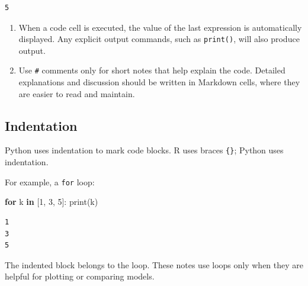 \documentclass[
  letterpaper,
  DIV=11,
  numbers=noendperiod]{scrreprt}
\newenvironment{Shaded}{\begin{snugshade}}{\end{snugshade}}
\newcommand{\BuiltInTok}[1]{\textcolor[rgb]{0.00,0.23,0.31}{#1}}
\newcommand{\ControlFlowTok}[1]{\textcolor[rgb]{0.00,0.23,0.31}{\textbf{#1}}}
\newcommand{\DecValTok}[1]{\textcolor[rgb]{0.68,0.00,0.00}{#1}}
\newcommand{\KeywordTok}[1]{\textcolor[rgb]{0.00,0.23,0.31}{\textbf{#1}}}
\newcommand{\NormalTok}[1]{\textcolor[rgb]{0.00,0.23,0.31}{#1}}
\theoremstyle{definition}
\theoremstyle{definition}
\theoremstyle{plain}
\theoremstyle{plain}
\theoremstyle{remark}
\begin{document}
\begin{verbatim}
5
\end{verbatim}

\begin{tcolorbox}[enhanced jigsaw, arc=.35mm, bottomrule=.15mm, bottomtitle=1mm, breakable, colback=white, colbacktitle=quarto-callout-note-color!10!white, colframe=quarto-callout-note-color-frame, coltitle=black, left=2mm, leftrule=.75mm, opacityback=0, opacitybacktitle=0.6, rightrule=.15mm, title=\textcolor{quarto-callout-note-color}{\faInfo}\hspace{0.5em}{Notebook}, titlerule=0mm, toprule=.15mm, toptitle=1mm]

\begin{enumerate}
\def\labelenumi{\arabic{enumi}.}
\item
  When a code cell is executed, the value of the last expression is
  automatically displayed. Any explicit output commands, such as
  \texttt{print()}, will also produce output.
\item
  Use \texttt{\#} comments only for short notes that help explain the
  code. Detailed explanations and discussion should be written in
  Markdown cells, where they are easier to read and maintain.
\end{enumerate}

\end{tcolorbox}

\subsection{Indentation}\label{indentation}

Python uses indentation to mark code blocks. R uses braces
\texttt{\{\}}; Python uses indentation.

For example, a \texttt{for} loop:

\begin{Shaded}
\begin{Highlighting}[]
\ControlFlowTok{for}\NormalTok{ k }\KeywordTok{in}\NormalTok{ [}\DecValTok{1}\NormalTok{, }\DecValTok{3}\NormalTok{, }\DecValTok{5}\NormalTok{]:}
    \BuiltInTok{print}\NormalTok{(k)}
\end{Highlighting}
\end{Shaded}

\begin{verbatim}
1
3
5
\end{verbatim}

The indented block belongs to the loop. These notes use loops only when
they are helpful for plotting or comparing models.
\end{document}
